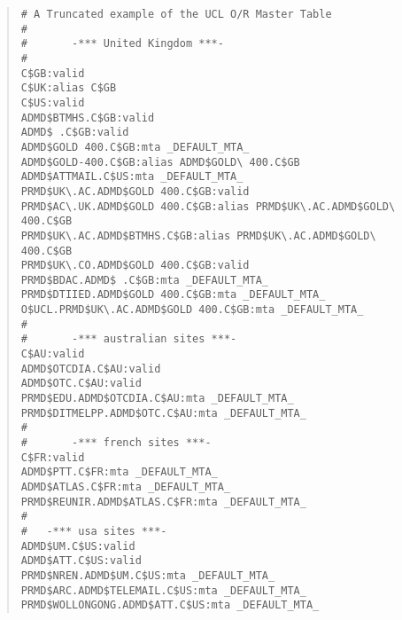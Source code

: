 \begin{quote}\footnotesize\begin{verbatim} 
# A Truncated example of the UCL O/R Master Table
#
#       -*** United Kingdom ***-
#
C$GB:valid
C$UK:alias C$GB
C$US:valid
ADMD$BTMHS.C$GB:valid
ADMD$ .C$GB:valid
ADMD$GOLD 400.C$GB:mta _DEFAULT_MTA_
ADMD$GOLD-400.C$GB:alias ADMD$GOLD\ 400.C$GB
ADMD$ATTMAIL.C$US:mta _DEFAULT_MTA_
PRMD$UK\.AC.ADMD$GOLD 400.C$GB:valid
PRMD$AC\.UK.ADMD$GOLD 400.C$GB:alias PRMD$UK\.AC.ADMD$GOLD\ 400.C$GB
PRMD$UK\.AC.ADMD$BTMHS.C$GB:alias PRMD$UK\.AC.ADMD$GOLD\ 400.C$GB
PRMD$UK\.CO.ADMD$GOLD 400.C$GB:valid
PRMD$BDAC.ADMD$ .C$GB:mta _DEFAULT_MTA_
PRMD$DTIIED.ADMD$GOLD 400.C$GB:mta _DEFAULT_MTA_
O$UCL.PRMD$UK\.AC.ADMD$GOLD 400.C$GB:mta _DEFAULT_MTA_
#
#       -*** australian sites ***-
C$AU:valid
ADMD$OTCDIA.C$AU:valid
ADMD$OTC.C$AU:valid
PRMD$EDU.ADMD$OTCDIA.C$AU:mta _DEFAULT_MTA_
PRMD$DITMELPP.ADMD$OTC.C$AU:mta _DEFAULT_MTA_
#
#       -*** french sites ***-
C$FR:valid
ADMD$PTT.C$FR:mta _DEFAULT_MTA_
ADMD$ATLAS.C$FR:mta _DEFAULT_MTA_
PRMD$REUNIR.ADMD$ATLAS.C$FR:mta _DEFAULT_MTA_
#
#	-*** usa sites ***-
ADMD$UM.C$US:valid
ADMD$ATT.C$US:valid
PRMD$NREN.ADMD$UM.C$US:mta _DEFAULT_MTA_
PRMD$ARC.ADMD$TELEMAIL.C$US:mta _DEFAULT_MTA_
PRMD$WOLLONGONG.ADMD$ATT.C$US:mta _DEFAULT_MTA_
\end{verbatim}\end{quote}
